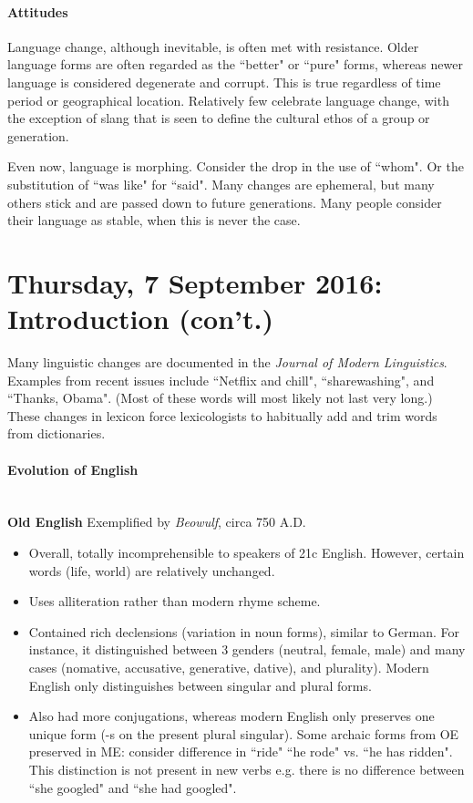 \documentclass{exam}
\begin{document}
\paragraph{Attitudes} Language change, although inevitable, is often met with resistance. Older language forms are often regarded as the ``better" or ``pure" forms, whereas newer language is considered degenerate and corrupt. This is true regardless of time period or geographical location. Relatively few celebrate language change, with the exception of slang that is seen to define the cultural ethos of a group or generation. \par Even now, language is morphing. Consider the drop in the use of ``whom". Or the substitution of ``was like" for ``said". Many changes are ephemeral, but many others stick and are passed down to future generations. Many people consider their language as stable, when this is never the case. 



\section*{Thursday, 7 September 2016: Introduction (con't.)}

Many linguistic changes are documented in the \textit{Journal of Modern Linguistics}. Examples from recent issues include ``Netflix and chill", ``sharewashing", and ``Thanks, Obama". (Most of these words will most likely not last very long.) These changes in lexicon force lexicologists to habitually add and trim words from dictionaries. 

\begin{center} 
\paragraph{Evolution of English }
\end{center}


\noindent \textbf{\\Old English} Exemplified by \textit{Beowulf}, circa 750 A.D. 
\begin{itemize}

\item Overall, totally incomprehensible to speakers of 21c English. However, certain words (life, world) are relatively unchanged.
\item Uses alliteration rather than modern rhyme scheme. 
\item Contained rich declensions (variation in noun forms), similar to German. For instance, it distinguished between 3 genders (neutral, female, male) and many cases (nomative, accusative, generative, dative), and plurality). Modern English only distinguishes between singular and plural forms. 

\item Also had more conjugations, whereas modern English only preserves one unique form (-s on the present plural singular). Some archaic forms from OE preserved in ME: consider difference in ``ride" ``he rode" vs. ``he has ridden". This distinction is not present in new verbs e.g. there is no difference between ``she googled" and ``she had googled". 


\end{itemize}
\end{document}
